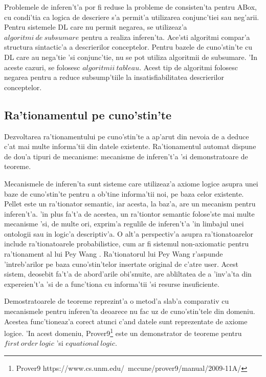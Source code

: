 \documentclass[12pt,a4paper,twoside]{report}
\begin{document}
Problemele de inferen't'a por fi reduse la probleme de consisten'ta pentru ABox, cu condi'tia ca logica de descriere s'a permit'a utilizarea conjunc'tiei sau neg'arii. Pentru sistemele DL care nu permit negarea, se utilizeaz'a $algoritmi\ de\ subsumare$ pentru a realiza inferen'ta. Ace'sti algoritmi compar'a structura sintactic'a a descrierilor conceptelor. Pentru bazele de cuno'stin'te cu DL care au nega'tie 'si conjunc'tie, nu se pot utiliza algoritmii de subsumare. 'In aceste cazuri, se folosesc $algoritmii\ tableau$. Acest tip de algoritmi folosesc negarea pentru a reduce subsump'tiile la insatisfiabilitatea descrierilor conceptelor.



\subsection{Ra'tionamentul pe cuno'stin'te}

Dezvoltarea ra'tionamentului pe cuno'stin'te a ap'arut din nevoia de a deduce c'at mai multe informa'tii din datele existente. Ra'tionamentul automat dispune de dou'a tipuri de mecanisme: mecanisme de inferen't'a 'si demonstratoare de teoreme. 

Mecanismele de inferen'ta sunt sisteme care utilizeaz'a axiome logice asupra unei baze de cuno'stin'te pentru a ob'tine informa'tii noi, pe baza celor existente. Pellet\cite{SirinPellet:Reasoner} este un ra'tionator semantic, iar acesta, la baz'a, are un mecanism pentru inferen't'a. 'in plus fa't'a de acestea, un ra'tiontor semantic folose'ste mai multe mecanisme 'si, de multe ori, exprim'a regulile de inferen't'a 'in limbajul unei ontologii sau in logic'a descriptiv'a. O alt'a perspectiv'a asupra ra'tionatoarelor include ra'tionatoarele probabilistice, cum ar fi sistemul non-axiomatic pentru ra'tionament al lui Pey Wang \cite{nonaxiomaticreasoner}. Ra'tionatorul lui Pey Wang r'aspunde 'intreb'arilor pe baza cuno'stin'telor insertate original de c'atre user. Acest sistem, deosebit fa't'a de abord'arile obi'snuite, are abliltatea de a 'inv'a'ta din expereien't'a 'si de a func'tiona cu informa'tii 'si resurse insuficiente.

Demostratoarele de teoreme reprezint'a o metod'a slab'a comparativ cu mecanismele pentru inferen'ta deoarece nu fac uz de cuno'stin'tele din domeniu. Acestea func'tioneaz'a corect atunci c'and datele sunt reprezentate de axiome logice. 'In acest domeniu, Prover9\footnote{Prover9 https://www.cs.unm.edu/~mccune/prover9/manual/2009-11A/} este un demonstrator de teoreme pentru $first\ order\ logic$ 'si $equational\ logic$.
\end{document}
